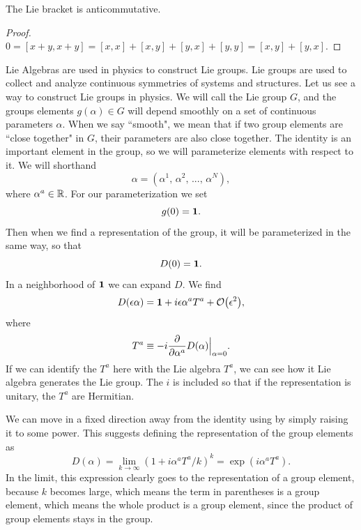 \begin{proposition}{}{}
  The Lie bracket is anticommutative.
  \begin{proof}
    $0=[x+y,x+y]=[x,x]+[x,y]+[y,x]+[y,y]=[x,y]+[y,x].$
  \end{proof}
\end{proposition}

Lie Algebras are used in physics to construct Lie groups.
Lie groups
are used to collect and analyze continuous symmetries of systems
and structures.
Let us see a way to construct Lie groups in physics. We will call the 
Lie group $G$, and the groups elements $g(\alpha)\in G$ will depend
smoothly on a set of continuous parameters $\alpha$. When we say ``smooth", we
mean that if two group elements are ``close together" in $G$, their parameters
are also close together. The identity is an important element in the group, so
we will parameterize elements with respect to it. We will shorthand
\begin{equation}
  \alpha=\left(\alpha^1,\,\alpha^2,\,...,\,\alpha^N\right),
\end{equation}
where $\alpha^a\in\mathbb{R}$. For our parameterization we set
\begin{equation}
  g(0)={\mathbf 1}.
\end{equation}
Then when we find a representation of the group, it will be
parameterized in the same way, so that
\begin{equation}
  D(0)={\mathbf 1}.
\end{equation}
In a neighborhood of ${\mathbf 1}$ we can expand $D$. We find
\begin{equation}\label{eq:Depsilon}
  D(\epsilon\alpha)=\id+i\epsilon\alpha^aT^a+\order{\epsilon^2},
\end{equation}
where
\begin{equation}
  T^a\equiv-i\pdv{\alpha^a}D(\alpha)\Big|_{\alpha=0}.
\end{equation}
If we can identify the $T^a$ here with the Lie algebra $T^a$, we can see
how it Lie algebra generates the Lie group. The $i$ is included so that
if the representation is unitary, the $T^a$ are Hermitian.

We can move in a fixed direction away from the identity using
 by simply raising it to some power. This suggests
defining the representation of the group elements as
\begin{equation}
  D(\alpha)=\lim_{k\to\infty}\left(1+i\alpha^aT^a/k\right)^k
           =\exp(i\alpha^aT^a).
\end{equation}
In the limit, this expression clearly goes to the representation of a group 
element, because $k$ becomes large, which means the term in parentheses is a 
group element, which means the whole product is a group element, since the
product of group elements stays in the group.

